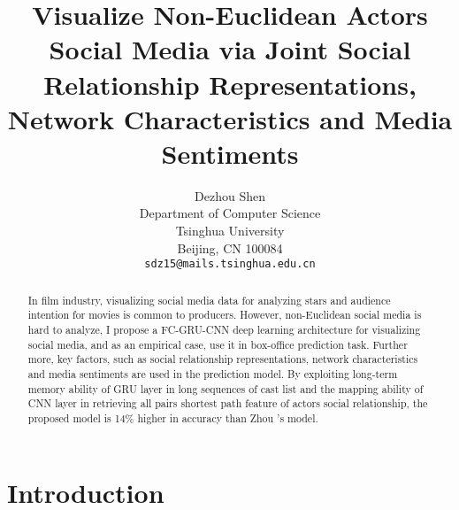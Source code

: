 \documentclass[review]{cvpr}
\begin{document}
\title{Visualize Non-Euclidean Actors Social Media via Joint Social Relationship Representations, Network Characteristics and Media Sentiments}

\author{Dezhou Shen\\
Department of Computer Science\\
Tsinghua University\\
Beijing, CN 100084\\
{\tt\small sdz15@mails.tsinghua.edu.cn}
}

\maketitle


\begin{abstract}
  In film industry, visualizing social media data for analyzing stars and audience intention for movies is common to producers.
  However, non-Euclidean social media is hard to analyze, I propose a FC-GRU-CNN deep learning architecture for visualizing social media, and as an empirical case, use it in box-office prediction task.
  Further more, key factors, such as social relationship representations, network characteristics and media sentiments are used in the prediction model.
  By exploiting long-term memory ability of GRU layer in long sequences of cast list and the mapping ability of CNN layer in retrieving all pairs shortest path feature of actors social relationship,
  the proposed model is 14\% higher in accuracy than Zhou \etal's model.
\end{abstract}

\section{Introduction}
\end{document}
